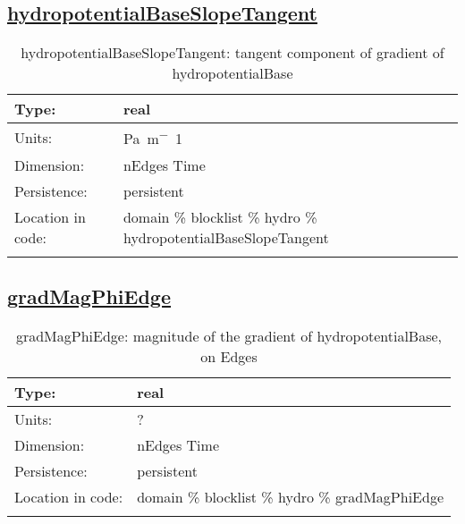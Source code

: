 \subsection[hydropotentialBaseSlopeTangent]{\hyperref[sec:var_tab_hydro]{hydropotentialBaseSlopeTangent}}
\label{subsec:var_sec_hydro_hydropotentialBaseSlopeTangent}
\begin{center}
\begin{longtable}{| p{2.0in} | p{4.0in} |}
        \hline 
        Type: & real \\
        \hline 
        Units: & \si{Pa.m^-1} \\
        \hline 
        Dimension: & nEdges Time \\
        \hline 
        Persistence: & persistent \\
        \hline 
         Location in code: & domain \% blocklist \% hydro \% hydropotentialBaseSlopeTangent \\
         \hline 
    \caption{hydropotentialBaseSlopeTangent: tangent component of gradient of hydropotentialBase}
\end{longtable}
\end{center}
\subsection[gradMagPhiEdge]{\hyperref[sec:var_tab_hydro]{gradMagPhiEdge}}
\label{subsec:var_sec_hydro_gradMagPhiEdge}
\begin{center}
\begin{longtable}{| p{2.0in} | p{4.0in} |}
        \hline 
        Type: & real \\
        \hline 
        Units: & \si{?} \\
        \hline 
        Dimension: & nEdges Time \\
        \hline 
        Persistence: & persistent \\
        \hline 
         Location in code: & domain \% blocklist \% hydro \% gradMagPhiEdge \\
         \hline 
    \caption{gradMagPhiEdge: magnitude of the gradient of hydropotentialBase, on Edges}
\end{longtable}
\end{center}
